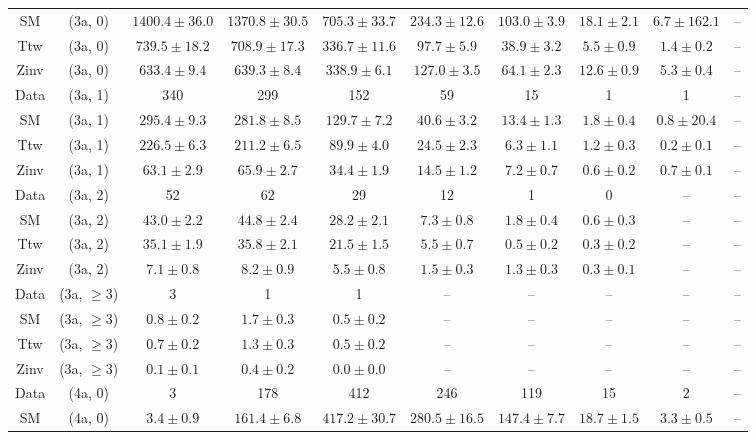 \begin{table}[h!]
{\begin{tabular}{cccccccccc}
	SM & (3a, 0) & $1400.4\pm 36.0$ & $1370.8\pm 30.5$ & $705.3\pm 33.7$ & $234.3\pm 12.6$ & $103.0\pm 3.9$ & $18.1\pm 2.1$ & $6.7\pm 162.1$ & -- \\[0.5ex] 
	Ttw & (3a, 0) & $739.5\pm 18.2$ & $708.9\pm 17.3$ & $336.7\pm 11.6$ & $97.7\pm 5.9$ & $38.9\pm 3.2$ & $5.5\pm 0.9$ & $1.4\pm 0.2$ & -- \\[0.5ex] 
	Zinv & (3a, 0) & $633.4\pm 9.4$ & $639.3\pm 8.4$ & $338.9\pm 6.1$ & $127.0\pm 3.5$ & $64.1\pm 2.3$ & $12.6\pm 0.9$ & $5.3\pm 0.4$ & -- \\[0.5ex] 
	Data & (3a, 1) & 340 & 299 & 152 & 59 & 15 & 1 & 1 & -- \\[0.5ex] 
	SM & (3a, 1) & $295.4\pm 9.3$ & $281.8\pm 8.5$ & $129.7\pm 7.2$ & $40.6\pm 3.2$ & $13.4\pm 1.3$ & $1.8\pm 0.4$ & $0.8\pm 20.4$ & -- \\[0.5ex] 
	Ttw & (3a, 1) & $226.5\pm 6.3$ & $211.2\pm 6.5$ & $89.9\pm 4.0$ & $24.5\pm 2.3$ & $6.3\pm 1.1$ & $1.2\pm 0.3$ & $0.2\pm 0.1$ & -- \\[0.5ex] 
	Zinv & (3a, 1) & $63.1\pm 2.9$ & $65.9\pm 2.7$ & $34.4\pm 1.9$ & $14.5\pm 1.2$ & $7.2\pm 0.7$ & $0.6\pm 0.2$ & $0.7\pm 0.1$ & -- \\[0.5ex] 
	Data & (3a, 2) & 52 & 62 & 29 & 12 & 1 & 0 & -- & -- \\[0.5ex] 
	SM & (3a, 2) & $43.0\pm 2.2$ & $44.8\pm 2.4$ & $28.2\pm 2.1$ & $7.3\pm 0.8$ & $1.8\pm 0.4$ & $0.6\pm 0.3$ & -- & -- \\[0.5ex] 
	Ttw & (3a, 2) & $35.1\pm 1.9$ & $35.8\pm 2.1$ & $21.5\pm 1.5$ & $5.5\pm 0.7$ & $0.5\pm 0.2$ & $0.3\pm 0.2$ & -- & -- \\[0.5ex] 
	Zinv & (3a, 2) & $7.1\pm 0.8$ & $8.2\pm 0.9$ & $5.5\pm 0.8$ & $1.5\pm 0.3$ & $1.3\pm 0.3$ & $0.3\pm 0.1$ & -- & -- \\[0.5ex] 
	Data & (3a, $\ge3$) & 3 & 1 & 1 & -- & -- & -- & -- & -- \\[0.5ex] 
	SM & (3a, $\ge3$) & $0.8\pm 0.2$ & $1.7\pm 0.3$ & $0.5\pm 0.2$ & -- & -- & -- & -- & -- \\[0.5ex] 
	Ttw & (3a, $\ge3$) & $0.7\pm 0.2$ & $1.3\pm 0.3$ & $0.5\pm 0.2$ & -- & -- & -- & -- & -- \\[0.5ex] 
	Zinv & (3a, $\ge3$) & $0.1\pm 0.1$ & $0.4\pm 0.2$ & $0.0\pm 0.0$ & -- & -- & -- & -- & -- \\[0.5ex] 
	Data & (4a, 0) & 3 & 178 & 412 & 246 & 119 & 15 & 2 & -- \\[0.5ex] 
	SM & (4a, 0) & $3.4\pm 0.9$ & $161.4\pm 6.8$ & $417.2\pm 30.7$ & $280.5\pm 16.5$ & $147.4\pm 7.7$ & $18.7\pm 1.5$ & $3.3\pm 0.5$ & -- \\[0.5ex] 

\end{tabular}}
\end{table}

